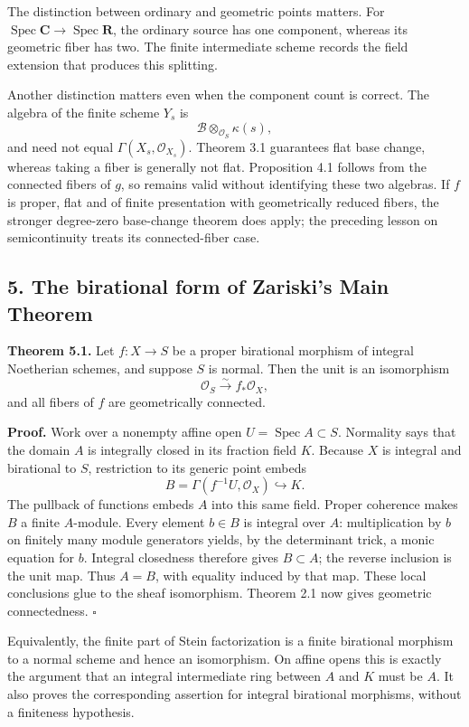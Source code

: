 \documentclass[11pt]{article}
\begin{document}
The distinction between ordinary and geometric points matters. For
\(\operatorname{Spec}\mathbf C\to\operatorname{Spec}\mathbf R\), the
ordinary source has one component, whereas its geometric fiber has two.
The finite intermediate scheme records the field extension that produces
this splitting.

Another distinction matters even when the component count is correct.
The algebra of the finite scheme \(Y_s\) is \[
\mathcal B\otimes_{\mathcal O_S}\kappa(s),
\] and need not equal \(\Gamma(X_s,\mathcal O_{X_s})\). Theorem 3.1
guarantees flat base change, whereas taking a fiber is generally not
flat. Proposition 4.1 follows from the connected fibers of \(g\), so
remains valid without identifying these two algebras. If \(f\) is
proper, flat and of finite presentation with geometrically reduced
fibers, the stronger degree-zero base-change theorem does apply; the
preceding lesson on semicontinuity treats its connected-fiber case.

\subsection{5. The birational form of Zariski's Main
Theorem}\label{the-birational-form-of-zariskis-main-theorem}

\textbf{Theorem 5.1.} Let \(f:X\to S\) be a proper birational morphism
of integral Noetherian schemes, and suppose \(S\) is normal. Then the
unit is an isomorphism \[
\mathcal O_S\xrightarrow{\sim}f_*\mathcal O_X,
\] and all fibers of \(f\) are geometrically connected.

\textbf{Proof.} Work over a nonempty affine open
\(U=\operatorname{Spec}A\subset S\). Normality says that the domain
\(A\) is integrally closed in its fraction field \(K\). Because \(X\) is
integral and birational to \(S\), restriction to its generic point
embeds \[
B=\Gamma(f^{-1}U,\mathcal O_X)\hookrightarrow K.
\] The pullback of functions embeds \(A\) into this same field. Proper
coherence makes \(B\) a finite \(A\)-module. Every element \(b\in B\) is
integral over \(A\): multiplication by \(b\) on finitely many module
generators yields, by the determinant trick, a monic equation for \(b\).
Integral closedness therefore gives \(B\subset A\); the reverse
inclusion is the unit map. Thus \(A=B\), with equality induced by that
map. These local conclusions glue to the sheaf isomorphism. Theorem 2.1
now gives geometric connectedness. \(\square\)

Equivalently, the finite part of Stein factorization is a finite
birational morphism to a normal scheme and hence an isomorphism. On
affine opens this is exactly the argument that an integral intermediate
ring between \(A\) and \(K\) must be \(A\). It also proves the
corresponding assertion for integral birational morphisms, without a
finiteness hypothesis.
\end{document}
